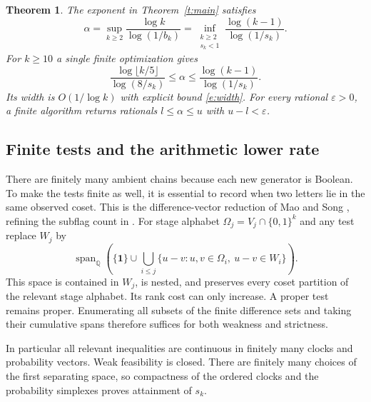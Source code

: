 \documentclass[11pt]{article}
\newtheorem{theorem}{Theorem}[section]
\numberwithin{equation}{section}
\newcommand{\Q}{\mathbb Q}
\newcommand{\one}{\mathbf 1}
\DeclareMathOperator{\spanop}{span}
\begin{document}
\begin{theorem}\label{t:variation}
The exponent in Theorem~\ref{t:main} satisfies
\begin{equation}
 \alpha=\sup_{k\ge2}\frac{\log k}{\log(1/b_k)}
       =\inf_{\substack{k\ge2\\s_k<1}}
                  \frac{\log(k-1)}{\log(1/s_k)} .
 \label{e:alpha}
\end{equation}
For $k\ge10$ a single finite optimization gives
\begin{equation}
 \frac{\log\lfloor k/5\rfloor}{\log(8/s_k)}
       \le\alpha\le\frac{\log(k-1)}{\log(1/s_k)} .
 \label{e:singlek}
\end{equation}
Its width is $O(1/\log k)$ with explicit bound \eqref{e:width}.
For every rational $\varepsilon>0$, a finite algorithm returns
rationals $l\le\alpha\le u$ with $u-l<\varepsilon$.
\end{theorem}

\subsection{Finite tests and the arithmetic lower rate}

There are finitely many ambient chains because each new generator
is Boolean. To make the tests finite as well, it is essential to
record when two letters lie in the same observed coset. This is
the difference-vector reduction of Mao and Song
\cite[Lemma~2.2]{ms}, refining the subflag count in
\cite[Section~4]{fgk}. For stage alphabet
$\Omega_j=V_j\cap\{0,1\}^k$ and any test replace $W_j$ by
\[
 \spanop_{\Q}\!\left(\{\one\}\cup
       \bigcup_{i\le j}\{u-v:u,v\in\Omega_i,\ u-v\in W_i\}\right).
\]
This space is contained in $W_j$, is nested, and preserves every
coset partition of the relevant stage alphabet. Its rank cost
can only increase. A proper test remains proper. Enumerating all
subsets of the finite difference sets and taking their cumulative
spans therefore suffices for both weakness and strictness.

In particular all relevant inequalities are continuous in finitely
many clocks and probability vectors. Weak feasibility is closed.
There are finitely many choices of the first separating space, so
compactness of the ordered clocks and the probability simplexes
proves attainment of $s_k$.
\end{document}
